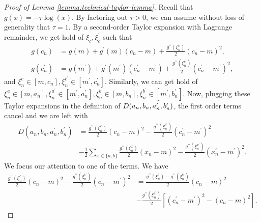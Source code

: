 \documentclass[11pt]{article}
\numberwithin{equation}{section}
\theoremstyle{definition}
\theoremstyle{remark}
\begin{document}
\begin{proof}[Proof of Lemma \ref{lemma:technical-taylor-lemma}]
    Recall that $g(x) = -\tau \log (x)$. By factoring out $\tau > 0$, we can assume without loss of generality that $\tau = 1$. 
    By a second-order Taylor expansion with Lagrange remainder, we get hold of $\xi_c,\xi^\prime_c$ such that
    \[
        \begin{aligned}
            g(c_n)        & = g(m) + g^\prime(m) (c_n - m) + \frac{g^{\prime \prime}(\xi_n^c)}{2}(c_n - m)^2,                                                     \\
            g(c^\prime_n) & = g(m^\prime) + g^\prime(m^\prime) (c^\prime_n - m^\prime) + \frac{g^{\prime \prime}(\xi_n^{c^\prime})}{2}(c^\prime_n - m^\prime)^2,
        \end{aligned}
    \]
    and $\xi_n^c \in [m, c_n], \xi_n^{c^\prime} \in [m^\prime, c_n^\prime]$. Similarly, we can get hold of $\xi_n^a \in [m,a_n], \xi_n^{a^\prime} \in [m^\prime, a^\prime_n], \xi_n^b \in [m,b_n], \xi_n^{b^\prime} \in [m^\prime, b^\prime_n]$. Now, plugging these Taylor expansions in the definition of $D(a_n,b_n,\\a^\prime_n,b^\prime_n)$, the first order terms cancel and we are left with
    \begin{equation}
        \label{eq:D-taylor-expanded}
        \begin{aligned}
            D(a_n,b_n,a^\prime_n,b^\prime_n) & = \frac{g^{\prime \prime}(\xi_n^c)}{2}(c_n - m)^2 - \frac{g^{\prime \prime}(\xi_n^{c^\prime})}{2}(c^\prime_n - m^\prime)^2                                  \\
                                             & - \frac{1}{2} \sum_{x \in \{a,b\}}\frac{g^{\prime \prime}(\xi_n^x)}{2}(x_n - m)^2 - \frac{g^{\prime \prime}(\xi_n^{x^\prime})}{2}(x^\prime_n - m^\prime)^2.
        \end{aligned}
    \end{equation}
    We focus our attention to one of the terms. We have
    \begin{equation}
        \label{eq:D-term-refactored}
        \begin{aligned}
            \frac{g^{\prime \prime}(\xi_n^c)}{2}(c_n - m)^2 - \frac{g^{\prime \prime}(\xi_n^{c^\prime})}{2}(c^\prime_n - m^\prime)^2 & = \frac{g^{\prime \prime}(\xi_n^c) - g^{\prime \prime}(\xi_n^{c^\prime})}{2}(c_n - m)^2             \\
        & - \frac{g^{\prime \prime}(\xi_n^{c^\prime})}{2}\left[(c^\prime_n - m^\prime)^2- (c_n - m)^2\right].

\end{aligned}
\end{equation}
\end{proof}
\end{document}
